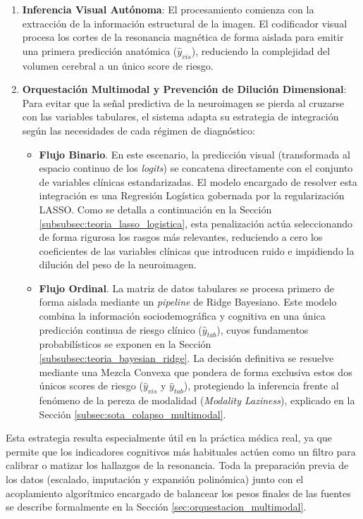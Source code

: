 \documentclass[12pt, oneside, english, spanish]{book}
\begin{document}
\begin{enumerate}
	\item \textbf{Inferencia Visual Autónoma}: El procesamiento comienza con la extracción de la información estructural de la imagen. El codificador visual procesa los cortes de la resonancia magnética de forma aislada para emitir una primera predicción anatómica ($\hat{y}_{vis}$), reduciendo la complejidad del volumen cerebral a un único score de riesgo.
	
	\item \textbf{Orquestación Multimodal y Prevención de Dilución Dimensional}: Para evitar que la señal predictiva de la neuroimagen se pierda al cruzarse con las variables tabulares, el sistema adapta su estrategia de integración según las necesidades de cada régimen de diagnóstico:
	
	\begin{itemize}
		\item \textbf{Flujo Binario}. En este escenario, la predicción visual (transformada al espacio continuo de los \textit{logits}) se concatena directamente con el conjunto de variables clínicas estandarizadas. El modelo encargado de resolver esta integración es una Regresión Logística gobernada por la regularización LASSO. Como se detalla a continuación en la Sección \ref{subsubsec:teoria_lasso_logistica}, esta penalización actúa seleccionando de forma rigurosa los rasgos más relevantes, reduciendo a cero los coeficientes de las variables clínicas que introducen ruido e impidiendo la dilución del peso de la neuroimagen.
		
		\item \textbf{Flujo Ordinal}. La matriz de datos tabulares se procesa primero de forma aislada mediante un \textit{pipeline} de Ridge Bayesiano. Este modelo combina la información sociodemográfica y cognitiva en una única predicción continua de riesgo clínico ($\hat{y}_{tab}$), cuyos fundamentos probabilísticos se exponen en la Sección \ref{subsubsec:teoria_bayesian_ridge}. La decisión definitiva se resuelve mediante una Mezcla Convexa que pondera de forma exclusiva estos dos únicos scores de riesgo ($\hat{y}_{vis}$ y $\hat{y}_{tab}$), protegiendo la inferencia frente al fenómeno de la pereza de modalidad (\textit{Modality Laziness}), explicado en la Sección \ref{subsec:sota_colapso_multimodal}.
	\end{itemize}
\end{enumerate}

Esta estrategia resulta especialmente útil en la práctica médica real, ya que permite que los indicadores cognitivos más habituales actúen como un filtro para calibrar o matizar los hallazgos de la resonancia. Toda la preparación previa de los datos (escalado, imputación y expansión polinómica) junto con el acoplamiento algorítmico encargado de balancear los pesos finales de las fuentes se describe formalmente en la Sección \ref{sec:orquestacion_multimodal}.
\end{document}
